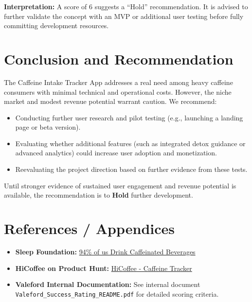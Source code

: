 \documentclass[11pt]{article}
\begin{document}
\bigskip
\textbf{Interpretation:} A score of 6 suggests a “Hold” recommendation. It is advised to further validate the concept with an MVP or additional user testing before fully committing development resources.

\section{Conclusion and Recommendation}
The Caffeine Intake Tracker App addresses a real need among heavy caffeine consumers with minimal technical and operational costs. However, the niche market and modest revenue potential warrant caution. We recommend:
\begin{itemize}[noitemsep]
    \item Conducting further user research and pilot testing (e.g., launching a landing page or beta version).
    \item Evaluating whether additional features (such as integrated detox guidance or advanced analytics) could increase user adoption and monetization.
    \item Reevaluating the project direction based on further evidence from these tests.
\end{itemize}
Until stronger evidence of sustained user engagement and revenue potential is available, the recommendation is to \textbf{Hold} further development.

\section{References / Appendices}
\begin{itemize}[noitemsep]
    \item \textbf{Sleep Foundation:} \href{https://www.sleepfoundation.org/sleep-news/94-percent-of-us-drink-caffeinated-beverages}{94\% of us Drink Caffeinated Beverages}
    \item \textbf{HiCoffee on Product Hunt:} \href{https://www.producthunt.com/p/hicoffee/hicoffee}{HiCoffee - Caffeine Tracker}
    \item \textbf{Valeford Internal Documentation:} See internal document \texttt{Valeford\_Success\_Rating\_README.pdf} for detailed scoring criteria.
\end{itemize}
\end{document}
